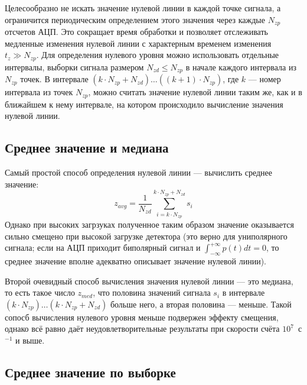 Целесообразно не искать значение нулевой линии в каждой точке сигнала, а ограничится периодическим определением этого значения через каждые $N_{zp}$ отсчетов АЦП. Это сокращает время обработки и позволяет отслеживать медленные изменения нулевой линии с характерным временем изменения $t_z \gg N_{zp}$. Для определения нулевого уровня можно использовать отдельные интервалы, выборки сигнала размером $N_{zd} \le N_{zp}$ в начале каждого интервала из $N_{zp}$ точек. В интервале $( k \cdot N_{zp} + N_{zd} ) \ldots ((k + 1) \cdot N_{zp})$, где $k$ --- номер интервала из точек $N_{zp}$, можно считать значение нулевой линии таким же, как и в ближайшем к нему интервале, на котором происходило вычисление значения нулевой линии. \cite{Khilkevitch2020}


\subsection{Среднее значение и медиана}

Самый простой способ определения нулевой линии --- вычислить среднее значение:
\begin{equation*}
  z_{avg} = \frac{1}{N_{zd}} \sum\limits_{i = k \cdot N_{zp}}^{  k \cdot N_{zp} + N_{zd} } s_i 
\end{equation*}
Однако при высоких загрзуках полученное таким образом значение оказывается сильно смещено при высокой загрузке детектора (это верно для униполярного сигнала; если на АЦП приходит биполярный сигнал и $ \int_{-\infty}^{+\infty} p(t) dt = 0 $, то среднее значение вполне адекватно описывает значение нулевой линии).  

Второй очевидный способ вычисления значения нулевой линии --- это медиана, то есть такое число $z_{med}$, что половина значений сигнала $s_i$ в интервале $(k \cdot N_{zp}) \ldots (k \cdot N_{zp} + N_{zd})$ больше него, а вторая половина --- меньше. Такой сопосб вычисления нулевого уровня меньше подвержен эффекту смещения, однако всё равно даёт неудовлетворительные результаты при скорости счёта $10^7$~с${}^{-1}$ и выше. \cite{Khilkevitch2020}


\subsection{Среднее значение по выборке}

